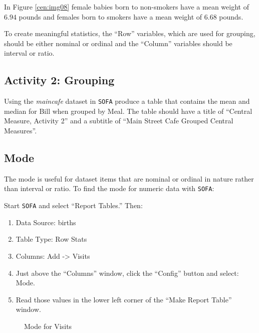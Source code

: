 In Figure \ref{cen:img08} female babies born to non-smokers have a mean weight of $ 6.94 $ pounds and females born to smokers have a mean weight of $ 6.68 $ pounds. 

To create meaningful statistics, the ``Row'' variables, which are used for grouping, should be either nominal or ordinal and the ``Column'' variables should be interval or ratio.

\subsection{Activity 2: Grouping} \label{cen:act02}

Using the \textit{maincafe} dataset in \texttt{SOFA} produce a table that contains the mean and median for Bill when grouped by Meal. The table should have a title of ``Central Measure, Activity 2'' and a subtitle of ``Main Street Cafe Grouped Central Measures''.

\subsection{Mode}

The mode is useful for dataset items that are nominal or ordinal in nature rather than interval or ratio. To find the mode for numeric data with \texttt{SOFA}:

Start \texttt{SOFA} and select ``Report Tables.'' Then:

\begin{enumerate}
  \item Data Source: births
  \item Table Type: Row Stats
  \item Columns: Add -> Visits
  \item Just above the ``Columns'' window, click the ``Config'' button and select: Mode.
  \item Read those values in the lower left corner of the ``Make Report Table'' window.
\end{enumerate}

\begin{figure}[H]
  \begin{center}
    \caption{Mode for Visits}
  \end{center}
\end{figure}

